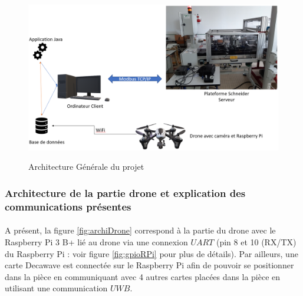         \begin{figure}[H]
            \centering
        	\begin{frame}{\includegraphics[width=1\textwidth]{image/architectureGenerale.png}}
        	\end{frame}
        	\caption{\label{fig:archiGen}Architecture Générale du projet}
        \end{figure}
    
    \subsubsection{Architecture de la partie drone et explication des communications présentes}
    \label{part:archiDrone}
        \paragraph*{}
        A présent, la figure \ref{fig:archiDrone} correspond à la partie du drone avec le Raspberry Pi 3 B+ lié au drone via une connexion $UART$ (pin 8 et 10 (RX/TX) du Raspberry Pi : voir figure \ref{fig:gpioRPi} pour plus de détails). Par ailleurs, une carte Decawave est connectée sur le Raspberry Pi afin de pouvoir se positionner dans la pièce en communiquant avec 4 autres cartes placées dans la pièce en utilisant une communication $UWB$.
        
